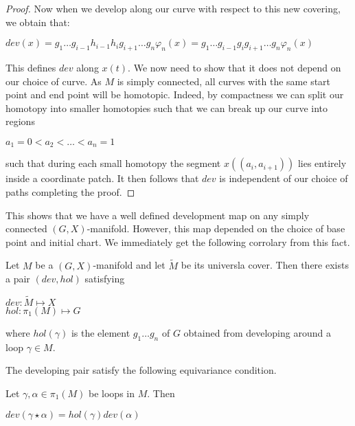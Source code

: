 \begin{proof}
    Now when we develop along our curve with respect to this new covering, we
    obtain that:

    \begin{center}
        $dev(x) = g_1 \dots g_{i-1}h_{i-1}h_{i}g_{i+1}\dots g_n\varphi_n(x) = g_1 \dots g_{i-1}g_ig_{i+1}\dots g_n\varphi_n(x)$
    \end{center}

    This defines $dev$ along $x(t)$. We now need to show that it does not depend on
    our choice of curve. As $M$ is simply connected, all curves with the same start
    point and end point will be homotopic. Indeed, by compactness we can split our
    homotopy into smaller homotopies such that we can break up our curve into
    regions
    \begin{center}
        $a_1 =0 < a_2 < \dots < a_n=1$
    \end{center}
    such that during each small homotopy the segment $x((a_i, a_{i+1}))$ lies entirely inside a coordinate patch. It then follows that $dev$ is independent of our choice of paths completing the proof.

\end{proof}

This shows that we have a well defined development map on any simply connected
$(G,X)$-manifold. However, this map depended on the choice of base point and
initial chart. We immediately get the following corrolary from this fact.

\begin{corollary}
    Let $M$ be a $(G,X)$-manifold and let $\tilde{M}$ be its universla cover. Then
    there exists a pair $(dev, hol)$ satisfying
    \begin{center}
        $dev : \tilde{M} \mapsto X$\\
        $hol: \pi_1(M) \mapsto G$
    \end{center}
    where $hol(\gamma)$ is the element $g_1\dots g_n$ of $G$ obtained from
    developing around a loop $\gamma \in M$.
\end{corollary}

The developing pair satisfy the following equivariance condition.
\begin{lemma}
    Let $\gamma, \alpha \in \pi_1(M)$ be loops in $M$. Then

    \begin{center}
        $dev(\gamma \star \alpha) = hol(\gamma)dev(\alpha)$
    \end{center}
\end{lemma}

